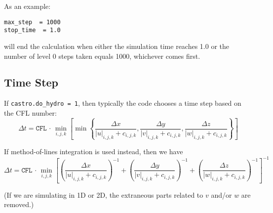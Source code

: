 As an example: 
\begin{lstlisting}
max_step  = 1000
stop_time  = 1.0
\end{lstlisting}
will end the calculation when either the simulation time reaches 1.0 or 
the number of level 0 steps taken equals 1000, whichever comes first.


\subsection{Time Step}
If {\tt castro.do\_hydro = 1}, then typically 
the code chooses a time step based on the CFL number:
\begin{equation}
\Delta t = \mathtt{CFL}\, \cdot\, \min_{i,j,k}\left[\min\left\{\frac{\Delta x}{|u|_{i,j,k}+c_{i,j,k}},
                                                               \frac{\Delta y}{|v|_{i,j,k}+c_{i,j,k}},
                                                               \frac{\Delta z}{|w|_{i,j,k}+c_{i,j,k}}\right\}\right]
\label{eq:cfl}
\end{equation}

If method-of-lines integration is used instead, then we have
\begin{equation}
\Delta t = \mathtt{CFL}\, \cdot\, \min_{i,j,k}\left[\left(\frac{\Delta x}{|u|_{i,j,k}+c_{i,j,k}}\right)^{-1} +
                                                    \left(\frac{\Delta y}{|v|_{i,j,k}+c_{i,j,k}}\right)^{-1} +
                                                    \left(\frac{\Delta z}{|w|_{i,j,k}+c_{i,j,k}}\right)^{-1}\right]^{-1}
\end{equation}

(If we are simulating in 1D or 2D, the extraneous parts related to $v$ and/or $w$ are removed.)

